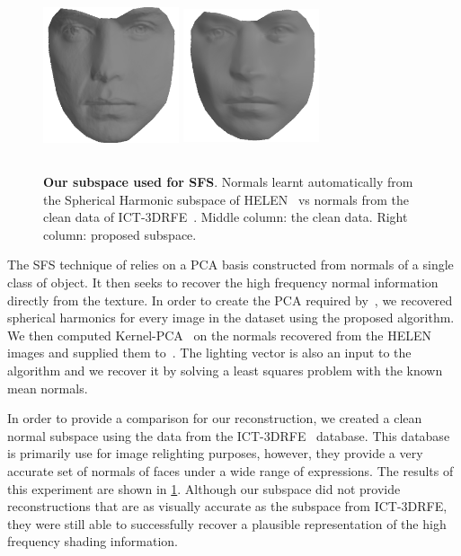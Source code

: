 \begin{figure}
    \includegraphics[width=4cm,height=4.8cm]{collection_ps/images/smith/law_smith_frontal_ict}             \hspace{0.3cm}
    \includegraphics[width=4cm,height=4.8cm]{collection_ps/images/smith/law_smith_frontal_low_rank}
    \caption{{\bf Our subspace used for SFS}. Normals learnt automatically from 
             the Spherical Harmonic subspace of HELEN~\cite{le2012interactive} vs
             normals from the clean data of ICT-3DRFE~\cite{stratou2012exploring}.
             Middle column: the clean data. 
             Right column: proposed subspace.}
\label{fig:imag_coll_smith}
\end{figure}
The SFS technique of \citet{smith2006recovering} relies on a PCA basis
constructed from normals of a single class of object. It then seeks to recover
the high frequency normal information directly from the texture. In order to
create the PCA required by~\cite{smith2006recovering}, we recovered spherical harmonics
for every image in the dataset using the proposed algorithm. We then computed
Kernel-PCA~\cite{Snape:2014de} on the normals recovered from the HELEN images
and supplied them to~\cite{smith2006recovering}. The lighting vector is also an input to
the algorithm and we recover it by solving a least squares problem with the
known mean normals.

In order to provide a comparison for our reconstruction, we created a clean
normal subspace using the data from the ICT-3DRFE~\cite{stratou2012exploring}
database. This database is primarily use for image relighting purposes, however,
they provide a very accurate set of normals of faces under a wide range of
expressions. The results of this experiment are shown in \cref{fig:imag_coll_smith}.
Although our subspace did not provide reconstructions that are as visually
accurate as the subspace from ICT-3DRFE, they were still able to successfully
recover a plausible representation of the high frequency shading information.
